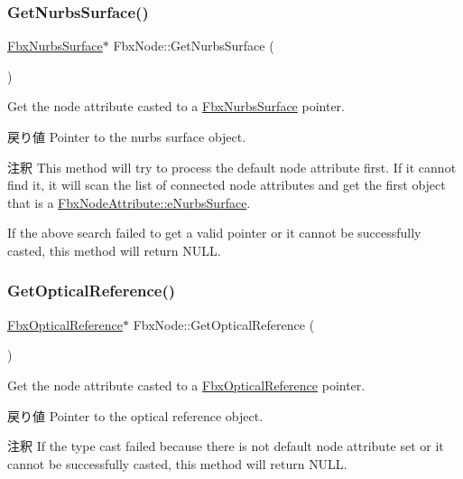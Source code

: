 \subsubsection{\texorpdfstring{Get\+Nurbs\+Surface()}{GetNurbsSurface()}}
{\footnotesize\ttfamily \hyperlink{class_fbx_nurbs_surface}{Fbx\+Nurbs\+Surface}$\ast$ Fbx\+Node\+::\+Get\+Nurbs\+Surface (\begin{DoxyParamCaption}{ }\end{DoxyParamCaption})}

Get the node attribute casted to a \hyperlink{class_fbx_nurbs_surface}{Fbx\+Nurbs\+Surface} pointer. \begin{DoxyReturn}{戻り値}
Pointer to the nurbs surface object. 
\end{DoxyReturn}
\begin{DoxyRemark}{注釈}
This method will try to process the default node attribute first. If it cannot find it, it will scan the list of connected node attributes and get the first object that is a \hyperlink{class_fbx_node_attribute_a08e1669d3d1a696910756ab17de56d6aa68f3a29a257dd9a8c734ae5118cbbec3}{Fbx\+Node\+Attribute\+::e\+Nurbs\+Surface}. 

If the above search failed to get a valid pointer or it cannot be successfully casted, this method will return {\ttfamily N\+U\+LL}. 
\end{DoxyRemark}
\mbox{\label{class_fbx_node_ac57938bd3c161cdaf7be7f786cbe1eeb}} 
\subsubsection{\texorpdfstring{Get\+Optical\+Reference()}{GetOpticalReference()}}
{\footnotesize\ttfamily \hyperlink{class_fbx_optical_reference}{Fbx\+Optical\+Reference}$\ast$ Fbx\+Node\+::\+Get\+Optical\+Reference (\begin{DoxyParamCaption}{ }\end{DoxyParamCaption})}

Get the node attribute casted to a \hyperlink{class_fbx_optical_reference}{Fbx\+Optical\+Reference} pointer. \begin{DoxyReturn}{戻り値}
Pointer to the optical reference object. 
\end{DoxyReturn}
\begin{DoxyRemark}{注釈}
If the type cast failed because there is not default node attribute set or it cannot be successfully casted, this method will return {\ttfamily N\+U\+LL}. 
\end{DoxyRemark}
\mbox{\label{class_fbx_node_a452b51cc94cfd4751d08b8a1ce26f72c}} 
